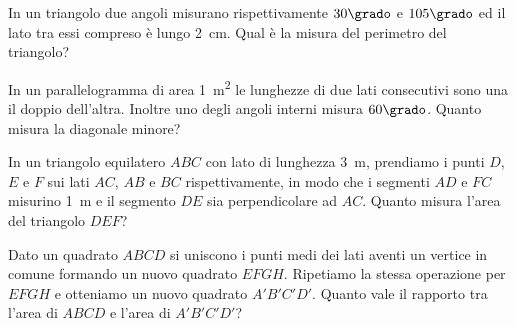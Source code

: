 \begin{multicols}{2}
%

\begin{esercizio}
\label{ese:7.110}
In un triangolo due angoli misurano rispettivamente $30\grado$ e 
$105\grado$ ed il lato tra essi compreso è lungo 2~cm. Qual è la 
misura del perimetro del triangolo? 
\end{esercizio}

\begin{esercizio}
\label{ese:7.111}
In un parallelogramma di area 1~m\textsuperscript{2} le lunghezze di 
due lati consecutivi sono una il doppio dell'altra. Inoltre uno degli 
angoli interni misura $60\grado$. Quanto misura la diagonale minore?
\end{esercizio}

\begin{esercizio}
\label{ese:7.112}
In un triangolo equilatero $ABC$ con lato di lunghezza 3~m, prendiamo 
i punti $D$, $E$ e $F$ sui lati $AC$, $AB$ e $BC$ rispettivamente, in 
modo che i segmenti $AD$ e $FC$ misurino 1~m e il segmento $DE$ sia 
perpendicolare ad $AC$. Quanto misura l'area del triangolo $DEF$?
\end{esercizio}

%

\begin{esercizio}
\label{ese:7.113}
Dato un quadrato $ABCD$ si uniscono i punti medi dei lati aventi un 
vertice in comune formando un nuovo quadrato $EFGH$. Ripetiamo la 
stessa operazione per $EFGH$ e otteniamo un nuovo quadrato 
$A'B'C'D'$. Quanto vale il rapporto tra l'area di $ABCD$ e l'area di 
$A'B'C'D'$?
\end{esercizio}

\end{multicols}


